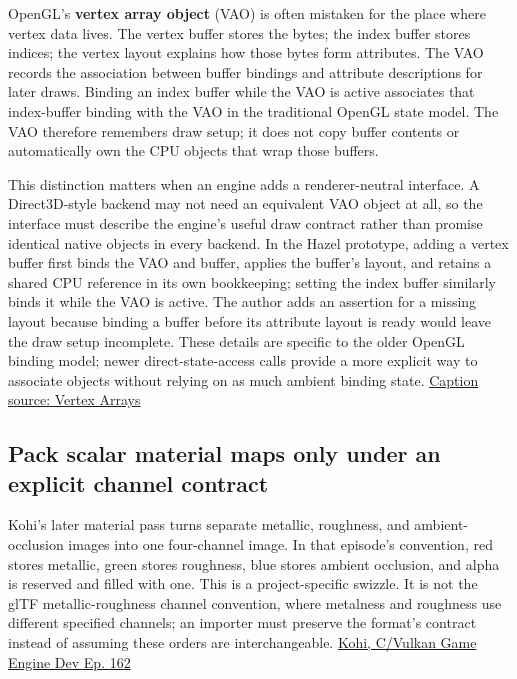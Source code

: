 \hypertarget{06-engine-ii-ch026-a-vertex-array-records-opengl-binding-state-it-does-not-own-the-buffers}{}

OpenGL's \textbf{vertex array object} (VAO) is often mistaken for the place where vertex data lives. The vertex buffer stores the bytes; the index buffer stores indices; the vertex layout explains how those bytes form attributes. The VAO records the association between buffer bindings and attribute descriptions for later draws. Binding an index buffer while the VAO is active associates that index-buffer binding with the VAO in the traditional OpenGL state model. The VAO therefore remembers draw setup; it does not copy buffer contents or automatically own the CPU objects that wrap those buffers.

This distinction matters when an engine adds a renderer-neutral interface. A Direct3D-style backend may not need an equivalent VAO object at all, so the interface must describe the engine's useful draw contract rather than promise identical native objects in every backend. In the Hazel prototype, adding a vertex buffer first binds the VAO and buffer, applies the buffer's layout, and retains a shared CPU reference in its own bookkeeping; setting the index buffer similarly binds it while the VAO is active. The author adds an assertion for a missing layout because binding a buffer before its attribute layout is ready would leave the draw setup incomplete. These details are specific to the older OpenGL binding model; newer direct-state-access calls provide a more explicit way to associate objects without relying on as much ambient binding state. \href{https://www.youtube.com/watch?v=rkxrw8dNrvI}{Caption source: Vertex Arrays}

\subsection{Pack scalar material maps only under an explicit channel contract}\label{06-engine-ii-ch026-pack-scalar-material-maps-only-under-an-explicit-channel-contract}

\hypertarget{06-engine-ii-ch026-pack-scalar-material-maps-only-under-an-explicit-channel-contract}{}

Kohi's later material pass turns separate metallic, roughness, and ambient-occlusion images into one four-channel image. In that episode's convention, red stores metallic, green stores roughness, blue stores ambient occlusion, and alpha is reserved and filled with one. This is a project-specific swizzle. It is not the glTF metallic-roughness channel convention, where metalness and roughness use different specified channels; an importer must preserve the format's contract instead of assuming these orders are interchangeable. \href{https://www.youtube.com/watch?v=C2zceJ88k7w}{Kohi, C/Vulkan Game Engine Dev Ep. 162}

